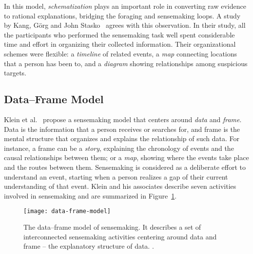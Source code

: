 In this model, \emph{schematization} plays an important role in converting raw evidence to rational explanations, bridging the foraging and sensemaking loops. A study by Kang, Görg and John Stasko~\cite{Kang2011} agrees with this observation. In their study, all the participants who performed the sensemaking task well spent considerable time and effort in organizing their collected information. Their organizational schemes were flexible: a \emph{timeline} of related events, a \emph{map} connecting locations that a person has been to, and a \emph{diagram} showing relationships among suspicious targets.

\subsection{Data--Frame Model}
\label{sub:rv-dfm}
Klein et al.~\cite{Klein2003} propose a sensemaking model that centers around \emph{data} and \emph{frame}. Data is the information that a person receives or searches for, and frame is the mental structure that organizes and explains the relationship of such data. For instance, a frame can be a \emph{story}, explaining the chronology of events and the causal relationships between
them; or a \emph{map}, showing where the events take place and the routes between them. Sensemaking is considered as a deliberate effort to understand an event, starting when a person realizes a gap of their current understanding of that event. Klein and his associates describe seven activities involved in sensemaking and are summarized in Figure~\ref{fig:data-frame-model}.

\begin{figure}[!htb]
	\centering
	\texttt{[image: data-frame-model]}
	\caption{The data--frame model of sensemaking. It describes a set of interconnected sensemaking activities centering around data and frame -- the explanatory structure of data. .}
	\label{fig:data-frame-model}
\end{figure}


